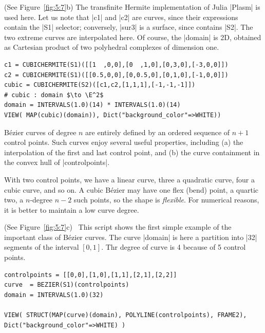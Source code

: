 \begin{coding}[Algebraic computation of FE = $\delta_1$]
{\begin{condition} (See Figure~\ref{fig:5:7}b)
\label{Transfinite-Hermite-surface}
The transfinite Hermite implementation of Julia |Plasm| is used here.
Let us note that |c1| and |c2| are curves, since their expressions contain the |S1| selector; conversely, |sur3| is a surface, since contains |S2|. The two extreme curves are interpolated here. Of course, the |domain| is 2D, obtained as Cartesian product of two polyhedral complexes of dimension one.
\begin{lstlisting}[language=JuliaLocal, style=julia, mathescape=true]
c1 = CUBICHERMITE(S1)([[1  ,0,0],[0  ,1,0],[0,3,0],[-3,0,0]])
c2 = CUBICHERMITE(S1)([[0.5,0,0],[0,0.5,0],[0,1,0],[-1,0,0]])
cubic = CUBICHERMITE(S2)([c1,c2,[1,1,1],[-1,-1,-1]])		
# cubic : domain $\to \E^2$
domain = INTERVALS(1.0)(14) * INTERVALS(1.0)(14)
VIEW( MAP(cubic)(domain)), Dict("background_color"=>WHITE))
\end{lstlisting}
\end{condition}



\begin{definition}
Bézier curves of degree $n$ are entirely defined by an ordered sequence of $n+1$ control points. Such curves enjoy several useful properties, including (a) the interpolation of the first and last control point, and (b) the curve containment in the convex hull of |controlpoints|.  
\end{definition}
With two control points, we have a linear curve, three a quadratic curve, four a cubic curve, and so on. A cubic Bézier may have one flex (bend) point, a quartic two, a $n$-degree $n-2$ such points, so the shape is \emph{flexible}. For numerical reasons, it is better to maintain a low curve degree.

\begin{condition} (See Figure~\ref{fig:5:7}c)\
\label{}
This script shows the first simple example of the important class of Bézier curves.  The curve |domain| is here a partition into |32| segments of the interval $[0,1]$. Thr degree of curve is 4 because of 5 control points.
\begin{lstlisting}[language=JuliaLocal, style=julia, mathescape=true]
controlpoints = [[0,0],[1,0],[1,1],[2,1],[2,2]]
curve  = BEZIER(S1)(controlpoints)
domain = INTERVALS(1.0)(32)

VIEW( STRUCT(MAP(curve)(domain), POLYLINE(controlpoints), FRAME2), Dict("background_color"=>WHITE) ) 
\end{lstlisting}
\end{condition}

}
\end{coding}
